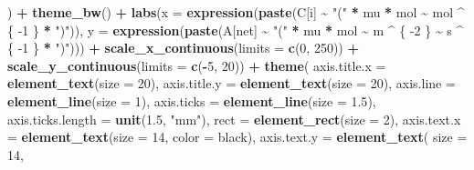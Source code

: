\documentclass[
]{krantz}
\makeatletter
\newenvironment{Shaded}{\begin{snugshade}}{\end{snugshade}}
\newcommand{\DataTypeTok}[1]{\textcolor[rgb]{0.13,0.29,0.53}{#1}}
\newcommand{\DecValTok}[1]{\textcolor[rgb]{0.00,0.00,0.81}{#1}}
\newcommand{\FloatTok}[1]{\textcolor[rgb]{0.00,0.00,0.81}{#1}}
\newcommand{\KeywordTok}[1]{\textcolor[rgb]{0.13,0.29,0.53}{\textbf{#1}}}
\newcommand{\NormalTok}[1]{#1}
\newcommand{\OperatorTok}[1]{\textcolor[rgb]{0.81,0.36,0.00}{\textbf{#1}}}
\newcommand{\StringTok}[1]{\textcolor[rgb]{0.31,0.60,0.02}{#1}}
\newenvironment{kframe}{%
\medskip{}
\setlength{\fboxsep}{.8em}
 \def\at@end@of@kframe{}%
 \ifinner\ifhmode%
  \def\at@end@of@kframe{\end{minipage}}%
  \begin{minipage}{\columnwidth}%
 \fi\fi%
 \def\FrameCommand##1{\hskip\@totalleftmargin \hskip-\fboxsep
 \colorbox{shadecolor}{##1}\hskip-\fboxsep
     \hskip-\linewidth \hskip-\@totalleftmargin \hskip\columnwidth}%
 \MakeFramed {\advance\hsize-\width
   \@totalleftmargin\z@ \linewidth\hsize
   \@setminipage}}%
 {\par\unskip\endMakeFramed%
 \at@end@of@kframe}
\renewenvironment{Shaded}{\begin{kframe}}{\end{kframe}}
\makeatother
\begin{document}
\begin{Shaded}
\begin{Highlighting}[]
\NormalTok{  ) }\OperatorTok{+}
\StringTok{  }\KeywordTok{theme\_bw}\NormalTok{() }\OperatorTok{+}
\StringTok{  }\KeywordTok{labs}\NormalTok{(}\DataTypeTok{x =} \KeywordTok{expression}\NormalTok{(}\KeywordTok{paste}\NormalTok{(C[i] }\OperatorTok{\textasciitilde{}}\StringTok{ "("} \OperatorTok{*}\StringTok{ }\NormalTok{mu }\OperatorTok{*}\StringTok{ }\NormalTok{mol }\OperatorTok{\textasciitilde{}}\StringTok{ }\NormalTok{mol }\OperatorTok{\^{}}\StringTok{ }\NormalTok{\{}
    \DecValTok{{-}1}
\NormalTok{  \} }\OperatorTok{*}\StringTok{ ")"}\NormalTok{)), }\DataTypeTok{y =} \KeywordTok{expression}\NormalTok{(}\KeywordTok{paste}\NormalTok{(A[net] }\OperatorTok{\textasciitilde{}}\StringTok{ "("} \OperatorTok{*}\StringTok{ }\NormalTok{mu }\OperatorTok{*}\StringTok{ }\NormalTok{mol }\OperatorTok{\textasciitilde{}}\StringTok{ }\NormalTok{m }\OperatorTok{\^{}}\StringTok{ }\NormalTok{\{}
    \DecValTok{{-}2}
\NormalTok{  \} }\OperatorTok{\textasciitilde{}}\StringTok{ }\NormalTok{s }\OperatorTok{\^{}}\StringTok{ }\NormalTok{\{}
    \DecValTok{{-}1}
\NormalTok{  \} }\OperatorTok{*}\StringTok{ ")"}\NormalTok{))) }\OperatorTok{+}
\StringTok{  }\KeywordTok{scale\_x\_continuous}\NormalTok{(}\DataTypeTok{limits =} \KeywordTok{c}\NormalTok{(}\DecValTok{0}\NormalTok{, }\DecValTok{250}\NormalTok{)) }\OperatorTok{+}
\StringTok{  }\KeywordTok{scale\_y\_continuous}\NormalTok{(}\DataTypeTok{limits =} \KeywordTok{c}\NormalTok{(}\OperatorTok{{-}}\DecValTok{5}\NormalTok{, }\DecValTok{20}\NormalTok{)) }\OperatorTok{+}
\StringTok{  }\KeywordTok{theme}\NormalTok{(}
    \DataTypeTok{axis.title.x =} \KeywordTok{element\_text}\NormalTok{(}\DataTypeTok{size =} \DecValTok{20}\NormalTok{),}
    \DataTypeTok{axis.title.y =} \KeywordTok{element\_text}\NormalTok{(}\DataTypeTok{size =} \DecValTok{20}\NormalTok{),}
    \DataTypeTok{axis.line =} \KeywordTok{element\_line}\NormalTok{(}\DataTypeTok{size =} \DecValTok{1}\NormalTok{),}
    \DataTypeTok{axis.ticks =} \KeywordTok{element\_line}\NormalTok{(}\DataTypeTok{size =} \FloatTok{1.5}\NormalTok{),}
    \DataTypeTok{axis.ticks.length =} \KeywordTok{unit}\NormalTok{(}\FloatTok{1.5}\NormalTok{, }\StringTok{"mm"}\NormalTok{),}
    \DataTypeTok{rect =} \KeywordTok{element\_rect}\NormalTok{(}\DataTypeTok{size =} \DecValTok{2}\NormalTok{),}
    \DataTypeTok{axis.text.x =} \KeywordTok{element\_text}\NormalTok{(}\DataTypeTok{size =} \DecValTok{14}\NormalTok{, }\DataTypeTok{color =} \StringTok{\textquotesingle{}black\textquotesingle{}}\NormalTok{),}
    \DataTypeTok{axis.text.y =}
      \KeywordTok{element\_text}\NormalTok{(}
        \DataTypeTok{size =} \DecValTok{14}\NormalTok{,}

\end{Highlighting}
\end{Shaded}
\end{document}
